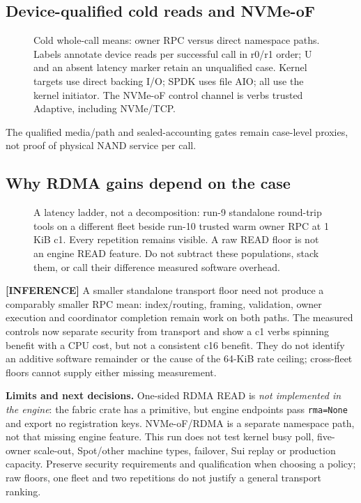 \clearpage
\subsection{Device-qualified cold reads and NVMe-oF}
\begin{figure}[H]\centering{}
\caption{Cold whole-call means: owner RPC versus direct namespace paths. Labels annotate device reads per successful call in r0/r1 order; U and an absent latency marker retain an unqualified case. Kernel targets use direct backing I/O; SPDK uses file AIO; all use the kernel initiator. The NVMe-oF control channel is verbs trusted Adaptive, including NVMe/TCP.}
\end{figure}
The qualified media/path and sealed-accounting gates remain case-level proxies, not proof of physical NAND service per call.

\clearpage
\subsection{Why RDMA gains depend on the case}\label{sec:rwc10-ladder}
\begin{figure}[H]\centering{}
\caption{A latency ladder, not a decomposition: run-9 standalone round-trip tools on a different fleet beside run-10 trusted warm owner RPC at 1 KiB c1. Every repetition remains visible. A raw READ floor is not an engine READ feature. Do not subtract these populations, stack them, or call their difference measured software overhead.}
\end{figure}
\textbf{[INFERENCE]} A smaller standalone transport floor need not produce a comparably smaller RPC mean: index/routing, framing, validation, owner execution and coordinator completion remain work on both paths. The measured controls now separate security from transport and show a c1 verbs spinning benefit with a CPU cost, but not a consistent c16 benefit. They do not identify an additive software remainder or the cause of the 64-KiB rate ceiling; cross-fleet floors cannot supply either missing measurement.

\textbf{Limits and next decisions.} One-sided RDMA READ is \emph{not implemented in the engine}: the fabric crate has a primitive, but engine endpoints pass \texttt{rma=None} and export no registration keys. NVMe-oF/RDMA is a separate namespace path, not that missing engine feature. This run does not test kernel busy poll, five-owner scale-out, Spot/other machine types, failover, Sui replay or production capacity. Preserve security requirements and qualification when choosing a policy; raw floors, one fleet and two repetitions do not justify a general transport ranking.
